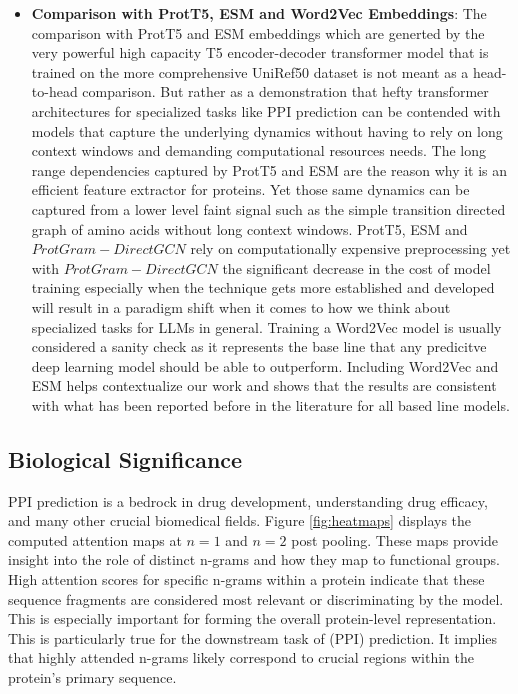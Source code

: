 \documentclass[utf8]{FrontiersinHarvard}
\begin{document}
\begin{itemize}
		\item \textbf{Comparison with ProtT5, ESM and Word2Vec Embeddings}: The comparison with ProtT5 and ESM embeddings which are generted by the very powerful high capacity T5 encoder-decoder transformer model that is trained on the more comprehensive UniRef50 dataset is not meant as a head-to-head comparison. But rather as a demonstration that hefty transformer architectures for specialized tasks like PPI prediction can be contended with models that capture the underlying dynamics without having to rely on long context windows and demanding computational resources needs. The long range dependencies captured by ProtT5 and ESM are the reason why it is an efficient feature extractor for proteins. Yet those same dynamics can be captured from a lower level faint signal such as the simple transition directed graph of amino acids without long context windows. ProtT5, ESM and $ProtGram-DirectGCN$ rely on computationally expensive preprocessing yet with $ProtGram-DirectGCN$ the significant decrease in the cost of model training especially when the technique gets more established and developed will result in a paradigm shift when it comes to how we think about specialized tasks for LLMs in general. Training a Word2Vec model is usually considered a sanity check as it represents the base line that any predicitve deep learning model should be able to outperform. Including Word2Vec and ESM helps contextualize our work and shows that the results are consistent with what has been reported before in the literature for all based line models.
	\end{itemize}
	
	\subsection{Biological Significance}
	\label{subsec:significance}
	PPI prediction is a bedrock in drug development, understanding drug efficacy, and many other crucial biomedical fields. Figure \ref{fig:heatmaps} displays the computed attention maps at $n=1$ and $n=2$ post pooling. These maps provide insight into the role of distinct n-grams and how they map to functional groups. High attention scores for specific n-grams within a protein indicate that these sequence fragments are considered most relevant or discriminating by the model. This is especially important for forming the overall protein-level representation. This is particularly true for the downstream task of (PPI) prediction. It implies that highly attended n-grams likely correspond to crucial regions within the protein's primary sequence.
	
\end{document}
